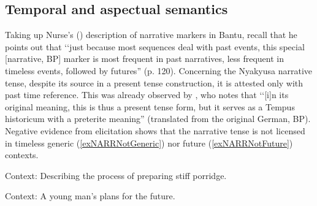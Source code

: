 \subsection{Temporal and aspectual semantics}
\label{NARRpast}
Taking up Nurse's (\citeyear{NurseD2008}) description of narrative markers in Bantu, recall that he points out that \lq\lq just because most sequences deal with past events, this special [narrative, BP] marker is most frequent in past narratives, less frequent in timeless events, followed by futures'' (p. 120). Concerning the Nyakyusa narrative tense, despite its source in a present tense construction, it is attested only with past time reference. This was already observed by \citet[61]{EndemannC1914}, who notes that \lq\lq [i]n its original meaning, this is thus a present tense form, but it serves as a Tempus historicum with a preterite meaning'' (translated from the original German, BP). Negative evidence from elicitation shows that the narrative tense is not licensed in timeless generic (\ref{exNARRNotGeneric}) nor future (\ref{exNARRNotFuture}) contexts.

\begin{exe}
\ex \label{exNARRNotGeneric}
Context: Describing the process of preparing stiff porridge.
\begin{xlist}
\end{xlist}
\ex \label{exNARRNotFuture} Context: A young man's plans for the future.
\begin{xlist}
\end{xlist}
\end{exe}

